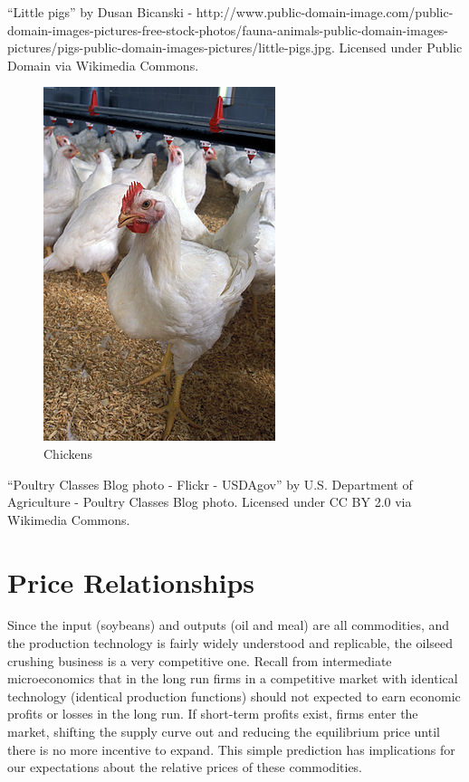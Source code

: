 \documentclass[
  letterpaper,
  DIV=11,
  numbers=noendperiod]{scrreprt}
\begin{document}
``Little pigs'' by Dusan Bicanski -
http://www.public-domain-image.com/public-domain-images-pictures-free-stock-photos/fauna-animals-public-domain-images-pictures/pigs-public-domain-images-pictures/little-pigs.jpg.
Licensed under Public Domain via Wikimedia Commons.

\begin{figure}

{\centering \includegraphics{images/poultry.jpg}

}

\caption{Chickens}

\end{figure}

``Poultry Classes Blog photo - Flickr - USDAgov'' by U.S. Department of
Agriculture - Poultry Classes Blog photo. Licensed under CC BY 2.0 via
Wikimedia Commons.

\hypertarget{price-relationships}{%
\section{Price Relationships}\label{price-relationships}}

Since the input (soybeans) and outputs (oil and meal) are all
commodities, and the production technology is fairly widely understood
and replicable, the oilseed crushing business is a very competitive one.
Recall from intermediate microeconomics that in the long run firms in a
competitive market with identical technology (identical production
functions) should not expected to earn economic profits or losses in the
long run. If short-term profits exist, firms enter the market, shifting
the supply curve out and reducing the equilibrium price until there is
no more incentive to expand. This simple prediction has implications for
our expectations about the relative prices of these commodities.
\end{document}
